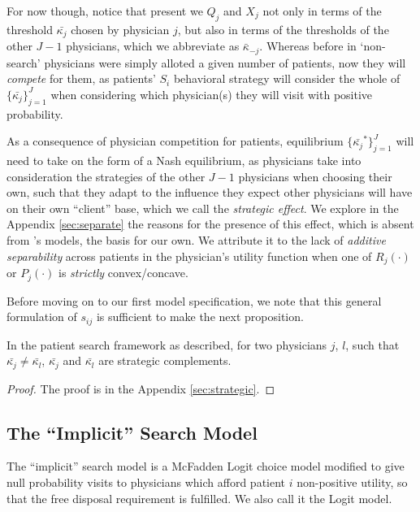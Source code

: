 \documentclass[../main.tex]{subfiles}
\begin{document}
For now though, notice that present we $Q_j$ and $X_j$  not only in terms of the threshold $\bar{\kappa_j}$ chosen by physician $j$, but also in terms of the thresholds of the other $J - 1$ physicians, which we abbreviate as $\bar{\kappa}_{-j}$. Whereas before in `non-search' physicians were simply alloted a given number of patients, now they will \textit{compete} for them, as patients' $S_i$ behavioral strategy will consider the whole of $\{\bar{\kappa_j}\}_{j =1}^{J}$ when considering which physician(s) they will visit with positive probability.

As a consequence of physician competition for patients, equilibrium $\{\bar{\kappa_j}^*\}_{j =1}^{J}$ will need to take on the form of a Nash equilibrium, as physicians take into consideration the strategies of the other $J - 1$ physicians when choosing their own, such that they adapt to the influence they expect other physicians will have on their own ``client'' base, which we call the \textit{strategic effect}. We explore in the Appendix \ref{sec:separate} the reasons for the presence of this effect, which is absent from \citeauthor{schnell2017physician}'s models, the basis for our own. We attribute it to the lack of \textit{additive separability} across patients in the physician's utility function when one of $R_j(\cdot)$ or $P_j(\cdot)$ is \textit{strictly} convex/concave.

Before moving on to our first model specification, we note that this general formulation of $s_{ij}$ is sufficient to make the next proposition.

\begin{prop}
    \label{complements}
In the patient search framework as described, for two physicians $j$, $l$, such that $\bar{\kappa_j} \neq \bar{\kappa_l}$, $\bar{\kappa_j}$ and $\bar{\kappa_l}$ are strategic complements.
\end{prop}

\begin{proof}
    The proof is in the Appendix \ref{sec:strategic}.
\end{proof}







\subsection{The ``Implicit'' Search Model}

The ``implicit'' search model is a McFadden Logit choice model modified to give null probability visits to physicians which afford patient $i$ non-positive utility, so that the free disposal requirement is fulfilled. We also call it the Logit model.
\end{document}
